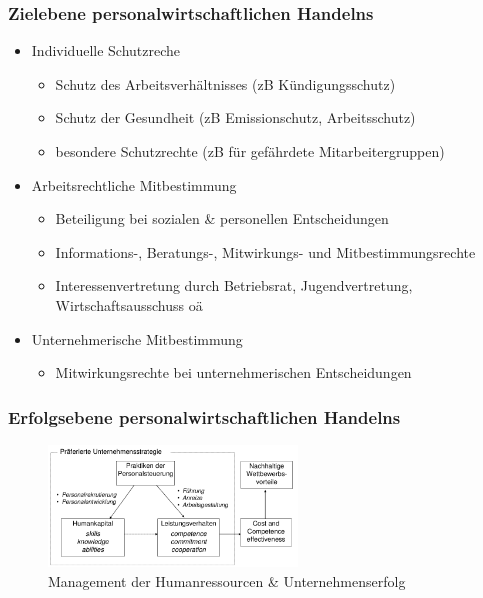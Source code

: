 \documentclass[11pt]{article}
\begin{document}
\subsubsection{Zielebene personalwirtschaftlichen Handelns}
\label{sec:org3730c41}
\begin{itemize}
\item Individuelle Schutzreche
\begin{itemize}
\item Schutz des Arbeitsverhältnisses (zB Kündigungsschutz)
\item Schutz der Gesundheit (zB Emissionschutz, Arbeitsschutz)
\item besondere Schutzrechte (zB für gefährdete Mitarbeitergruppen)
\end{itemize}
\item Arbeitsrechtliche Mitbestimmung
\begin{itemize}
\item Beteiligung bei sozialen \& personellen Entscheidungen
\item Informations-, Beratungs-, Mitwirkungs- und Mitbestimmungsrechte
\item Interessenvertretung durch Betriebsrat, Jugendvertretung, Wirtschaftsausschuss oä
\end{itemize}
\item Unternehmerische Mitbestimmung
\begin{itemize}
\item Mitwirkungsrechte bei unternehmerischen Entscheidungen
\end{itemize}
\end{itemize}

\subsubsection{Erfolgsebene personalwirtschaftlichen Handelns}
\label{sec:orgdc31938}
\begin{figure}[htbp]
\centering
\includegraphics[width=250px]{./pictures/perserfolg.png}
\caption{Management der Humanressourcen \& Unternehmenserfolg}
\end{figure} 
\end{document}
